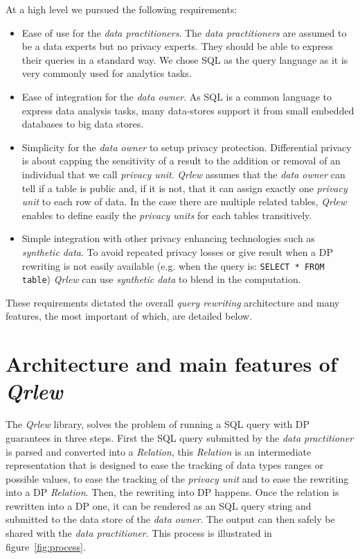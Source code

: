 \documentclass[letterpaper]{article} %
\newcommand{\qrlew}{\emph{Qrlew}}
\begin{document}
At a high level we pursued the following requirements:
\begin{itemize}
    \item Ease of use for the \emph{data practitioners}. The \emph{data practitioners} are assumed to be a data experts but no privacy experts. They should be able to express their queries in a standard way. We chose SQL as the query language as it is very commonly used for analytics tasks.
    \item Ease of integration for the \emph{data owner}. As SQL is a common language to express data analysis tasks, many data-stores support it from small embedded databases to big data stores.
    \item Simplicity for the \emph{data owner} to setup privacy protection. Differential privacy is about capping the sensitivity of a result to the addition or removal of an individual that we call \emph{privacy unit}. \qrlew{} assumes that the \emph{data owner} can tell if a table is public and, if it is not, that it can assign exactly one \emph{privacy unit} to each row of data. In the case there are multiple related tables, \qrlew{} enables to define easily the \emph{privacy units} for each tables transitively.
    \item Simple integration with other privacy enhancing technologies such as \emph{synthetic data}. To avoid repeated privacy losses or give result when a DP rewriting is not easily available (e.g. when the query is: \texttt{SELECT * FROM table}) \qrlew{} can use \emph{synthetic data} to blend in the computation.
\end{itemize}

These requirements dictated the overall \emph{query rewriting} architecture and many features, the most important of which, are detailed below.

\section{Architecture and main features of \qrlew}

The \qrlew{} library, solves the problem of running a SQL query with DP guarantees in three steps. First the SQL query submitted by the \emph{data practitioner} is parsed and converted into a \emph{Relation}, this \emph{Relation} is an intermediate representation that is designed to ease the tracking of data types ranges or possible values, to ease the tracking of the \emph{privacy unit} and to ease the rewriting into a DP \emph{Relation}. Then, the rewriting into DP happens. Once the relation is rewritten into a DP one, it can be rendered as an SQL query string and submitted to the data store of the \emph{data owner}. The output can then safely be shared with the \emph{data practitioner}. This process is illustrated in figure~\ref{fig:process}.
\end{document}
